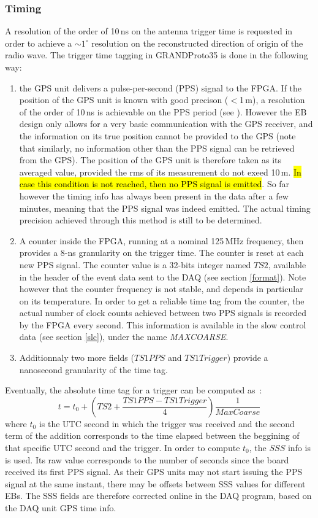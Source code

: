 \subsubsection{Timing}
\label{timing}
A resolution of the order of 10\,ns on the antenna trigger time is requested in order to achieve a $\sim1^{\circ}$ resolution on the reconstructed direction of origin of the radio wave. The trigger time tagging in GRANDProto35 is done in the following way: 
\begin{enumerate}[-]
\item{the GPS unit delivers a pulse-per-second (PPS) signal to the FPGA. If the position of the GPS unit is known with good precison ($<$1\,m), a resolution of the order of 10\,ns is achievable on the PPS period (see \cite{GPS}). However the EB design only allows for a very basic communication with the GPS receiver, and the information on its true position cannot be provided to the GPS (note that similarly, no information other than the PPS signal can be retrieved from the GPS). The position of the GPS unit is therefore taken as its averaged value, provided the rms of its measurement do not exeed 10\,m. \hl{In case this condition is not reached, then no PPS signal is emitted}. So far however the timing info has always been present in the data after a few minutes, meaning that the PPS signal was indeed emitted. The actual timing precision achieved through this method is still to be determined.} 
\item{A counter inside the FPGA, running at a nominal 125\,MHz frequency, then provides a 8-ns granularity on the trigger time. The counter is reset at each new PPS signal. The counter value is a 32-bits integer named $TS2$, available in the header of the event data sent to the DAQ (see section \ref{format}). Note however that the counter frequency is not stable, and depends in particular on its temperature. In order to get a reliable time tag from the counter, the actual number of clock counts achieved between two PPS signals is recorded by the FPGA every second. This information is available in the slow control data (see section \ref{slc}), under the name {\it MAXCOARSE}.} 
\item{Additionnaly two more fields ($TS1PPS$ and $TS1Trigger$)  provide a nanosecond granularity of the time tag.} 
\end{enumerate}

Eventually, the absolute time tag for a trigger can be computed as~:
$$
t = t_0+\left(TS2+\frac{TS1PPS-TS1Trigger}{4}\right)\frac{1}{MaxCoarse} 
$$
where $t_0$ is the UTC second in which the trigger was received and the second term of the addition corresponds to the time elapsed between the beggining of that specific UTC second and the trigger. In order to compute $t_0$, the $SSS$ info is is used. Its raw value corresponds to the number of seconds since the board received its first PPS signal. As their GPS units may not start issuing the PPS signal at the same instant, there may be offsets between SSS values for different EBs. The SSS fields are therefore corrected online in the DAQ program, based on the DAQ unit GPS time info.



